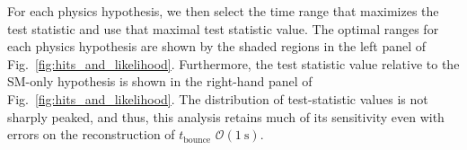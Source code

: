 For each physics hypothesis, we then select the time range that maximizes the test statistic and use that maximal test statistic value.
The optimal ranges for each physics hypothesis are shown by the shaded regions in the left panel of Fig.~\ref{fig:hits_and_likelihood}. Furthermore, the test statistic value relative to the SM-only hypothesis is shown in the right-hand panel of Fig.~\ref{fig:hits_and_likelihood}.
The distribution of test-statistic values is not sharply peaked, and thus, this analysis retains much of its sensitivity even with errors on the reconstruction of $t_{\mathrm{bounce}}$ $\mathcal{O}\left(1~\mathrm{s}\right)$.